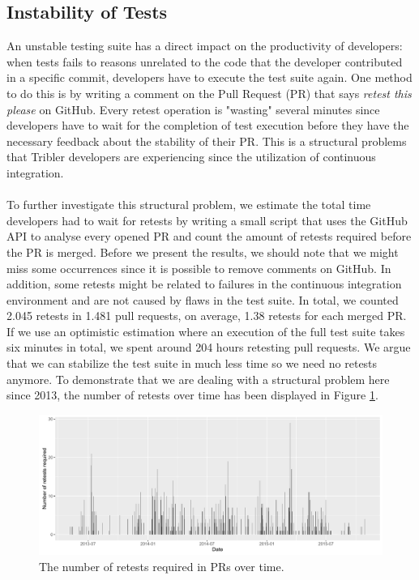 \subsection{Instability of Tests}
\label{subsec:instability-tests}
An unstable testing suite has a direct impact on the productivity of developers: when tests fails to reasons unrelated to the code that the developer contributed in a specific commit, developers have to execute the test suite again. One method to do this is by writing a comment on the Pull Request (PR) that says \emph{retest this please} on GitHub. Every retest operation is "wasting" several minutes since developers have to wait for the completion of test execution before they have the necessary feedback about the stability of their PR. This is a structural problems that Tribler developers are experiencing since the utilization of continuous integration.\\\\
To further investigate this structural problem, we estimate the total time developers had to wait for retests by writing a small script that uses the GitHub API to analyse every opened PR and count the amount of retests required before the PR is merged. Before we present the results, we should note that we might miss some occurrences since it is possible to remove comments on GitHub. In addition, some retests might be related to failures in the continuous integration environment and are not caused by flaws in the test suite. In total, we counted 2.045 retests in 1.481 pull requests, on average, 1.38 retests for each merged PR. If we use an optimistic estimation where an execution of the full test suite takes six minutes in total, we spent around 204 hours retesting pull requests. We argue that we can stabilize the test suite in much less time so we need no retests anymore. To demonstrate that we are dealing with a structural problem here since 2013, the number of retests over time has been displayed in Figure \ref{fig:retest-this-please-required}.\\

\begin{figure}[h!]
	\centering
	\includegraphics[width=1.0\columnwidth]{images/improving_qa/retests_required}
	\caption{The number of retests required in PRs over time.}
	\label{fig:retest-this-please-required}
\end{figure}

